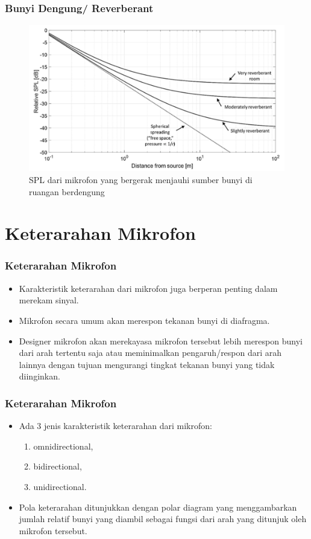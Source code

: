 \documentclass[pdflatex,compress]{beamer}
\begin{document}
\begin{frame}
	\frametitle{Bunyi Dengung/ Reverberant}
	\begin{figure}
		\centering
		\includegraphics[width=0.9\linewidth]{img/img013}
		\caption{SPL dari mikrofon yang bergerak menjauhi sumber bunyi di ruangan berdengung}
		\label{fig:img013}
	\end{figure}
\end{frame}

\section{Keterarahan Mikrofon}

\begin{frame}
	\frametitle{Keterarahan Mikrofon}
	\begin{itemize}
		\item Karakteristik keterarahan dari mikrofon juga berperan penting dalam merekam sinyal.
		\item Mikrofon secara umum akan merespon tekanan bunyi di diafragma.
		\item Designer mikrofon akan merekayasa mikrofon tersebut lebih merespon bunyi dari arah tertentu saja atau meminimalkan pengaruh/respon dari arah lainnya dengan tujuan mengurangi tingkat tekanan bunyi yang tidak diinginkan.
	\end{itemize}
\end{frame}

\begin{frame}
	\frametitle{Keterarahan Mikrofon}
	\begin{itemize}
		\item Ada 3 jenis karakteristik keterarahan dari mikrofon:
		\begin{enumerate}
			\item omnidirectional,
			\item bidirectional,
			\item unidirectional.
		\end{enumerate}
		\item Pola keterarahan ditunjukkan dengan polar diagram yang menggambarkan jumlah relatif bunyi yang diambil sebagai fungsi dari arah yang ditunjuk oleh mikrofon tersebut.
	\end{itemize}
\end{frame}
\end{document}
